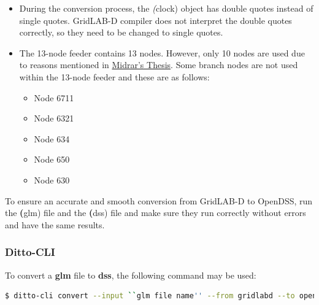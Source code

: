 \begin{itemize}
    \item During the conversion process, the \textit(clock) object has double quotes instead of single quotes. GridLAB-D compiler does not interpret the double quotes correctly, so they need to 
    be changed to single quotes.
    \item The 13-node feeder contains 13 nodes. However, only 10 nodes are used due to reasons mentioned in \href{https://pdxscholar.library.pdx.edu/open_access_etds/6101/}{Midrar's Thesis}.
    Some branch nodes are not used within the 13-node feeder and these are as follows:
    \begin{itemize}
        \item Node 6711
        \item Node 6321
        \item Node 634
        \item Node 650
        \item Node 630
    \end{itemize}
\end{itemize}
To ensure an accurate and smooth conversion from GridLAB-D to OpenDSS, run the \textbf(glm) file and the \textbf(dss) file and make sure they run correctly without errors and have the same
results.

\subsubsection{Ditto-CLI}
To convert a \textbf{glm} file to \textbf{dss}, the following command may be used:
\begin{lstlisting}[language=bash]
    $ ditto-cli convert --input ``glm file name'' --from gridlabd --to opendss --output ``output file directory''
\end{lstlisting}


